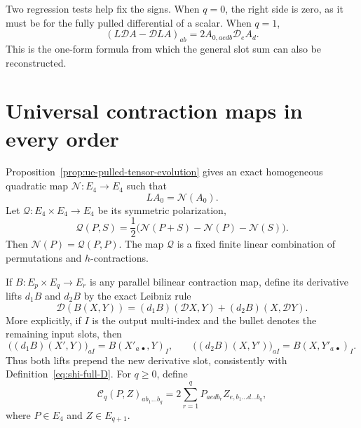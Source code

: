 \documentclass[10pt]{coll-l}
\theoremstyle{definition}
\theoremstyle{remark}
\numberwithin{section}{chapter}
\numberwithin{equation}{chapter}
\begin{document}
Two regression tests help fix the signs.  When $q=0$, the right side is
zero, as it must be for the fully pulled differential of a scalar.  When
$q=1$,
\[
 (L\mathcal DA-\mathcal DLA)_{ab}
       =2A_{0,aedb}\mathcal D_eA_d.
\]
This is the one-form formula from which the general slot sum can also be
reconstructed.

\section{Universal contraction maps in every order}
\label{sec:shi-universal-maps}

Proposition~\ref{prop:ue-pulled-tensor-evolution} gives an exact homogeneous
quadratic map $\mathcal N:E_4\to E_4$ such that
\begin{equation}
                       LA_0=\mathcal N(A_0).             \label{eq:shi-base-evolution-N}
\end{equation}
Let $\mathcal Q:E_4\times E_4\to E_4$ be its symmetric polarization,
\begin{equation}
 \mathcal Q(P,S)
   =\frac12\bigl(\mathcal N(P+S)-\mathcal N(P)-\mathcal N(S)\bigr).  \label{eq:shi-Q-polarization}
\end{equation}
Then $\mathcal N(P)=\mathcal Q(P,P)$.  The map $\mathcal Q$ is a fixed
finite linear combination of permutations and $h$-contractions.

If $B:E_p\times E_q\to E_r$ is any parallel bilinear contraction map,
define its derivative lifts $d_1B$ and $d_2B$ by the exact Leibniz rule
\begin{equation}
 \mathcal D(B(X,Y))
     =(d_1B)(\mathcal DX,Y)+(d_2B)(X,\mathcal DY).        \label{eq:shi-derivative-lifts}
\end{equation}
More explicitly, if $I$ is the output multi-index and the bullet denotes the
remaining input slots, then
\begin{equation}
 \bigl((d_1B)(X',Y)\bigr)_{aI}=B(X'_{a\,\bullet},Y)_I,
 \qquad
 \bigl((d_2B)(X,Y')\bigr)_{aI}=B(X,Y'_{a\,\bullet})_I.   \label{eq:shi-derivative-lift-slots}
\end{equation}
Thus both lifts prepend the new derivative slot, consistently with
Definition~\eqref{eq:shi-full-D}.
For $q\geq0$, define
\begin{equation}
 \mathcal C_q(P,Z)_{a b_1\ldots b_q}
   =2\sum_{r=1}^q
       P_{aedb_r}Z_{e,b_1\ldots d\ldots b_q},            \label{eq:shi-Cq-definition}
\end{equation}
where $P\in E_4$ and $Z\in E_{q+1}$.
\end{document}
